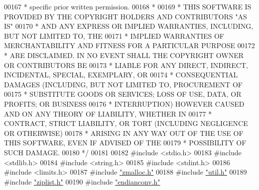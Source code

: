 \begin{DoxyCode}
00167 \textcolor{comment}{ *     specific prior written permission.}
00168 \textcolor{comment}{ *}
00169 \textcolor{comment}{ * THIS SOFTWARE IS PROVIDED BY THE COPYRIGHT HOLDERS AND CONTRIBUTORS "AS IS"}
00170 \textcolor{comment}{ * AND ANY EXPRESS OR IMPLIED WARRANTIES, INCLUDING, BUT NOT LIMITED TO, THE}
00171 \textcolor{comment}{ * IMPLIED WARRANTIES OF MERCHANTABILITY AND FITNESS FOR A PARTICULAR PURPOSE}
00172 \textcolor{comment}{ * ARE DISCLAIMED. IN NO EVENT SHALL THE COPYRIGHT OWNER OR CONTRIBUTORS BE}
00173 \textcolor{comment}{ * LIABLE FOR ANY DIRECT, INDIRECT, INCIDENTAL, SPECIAL, EXEMPLARY, OR}
00174 \textcolor{comment}{ * CONSEQUENTIAL DAMAGES (INCLUDING, BUT NOT LIMITED TO, PROCUREMENT OF}
00175 \textcolor{comment}{ * SUBSTITUTE GOODS OR SERVICES; LOSS OF USE, DATA, OR PROFITS; OR BUSINESS}
00176 \textcolor{comment}{ * INTERRUPTION) HOWEVER CAUSED AND ON ANY THEORY OF LIABILITY, WHETHER IN}
00177 \textcolor{comment}{ * CONTRACT, STRICT LIABILITY, OR TORT (INCLUDING NEGLIGENCE OR OTHERWISE)}
00178 \textcolor{comment}{ * ARISING IN ANY WAY OUT OF THE USE OF THIS SOFTWARE, EVEN IF ADVISED OF THE}
00179 \textcolor{comment}{ * POSSIBILITY OF SUCH DAMAGE.}
00180 \textcolor{comment}{ */}
00181 
00182 \textcolor{preprocessor}{#}\textcolor{preprocessor}{include} \textcolor{preprocessor}{<}\textcolor{preprocessor}{stdio}\textcolor{preprocessor}{.}\textcolor{preprocessor}{h}\textcolor{preprocessor}{>}
00183 \textcolor{preprocessor}{#}\textcolor{preprocessor}{include} \textcolor{preprocessor}{<}\textcolor{preprocessor}{stdlib}\textcolor{preprocessor}{.}\textcolor{preprocessor}{h}\textcolor{preprocessor}{>}
00184 \textcolor{preprocessor}{#}\textcolor{preprocessor}{include} \textcolor{preprocessor}{<}\textcolor{preprocessor}{string}\textcolor{preprocessor}{.}\textcolor{preprocessor}{h}\textcolor{preprocessor}{>}
00185 \textcolor{preprocessor}{#}\textcolor{preprocessor}{include} \textcolor{preprocessor}{<}\textcolor{preprocessor}{stdint}\textcolor{preprocessor}{.}\textcolor{preprocessor}{h}\textcolor{preprocessor}{>}
00186 \textcolor{preprocessor}{#}\textcolor{preprocessor}{include} \textcolor{preprocessor}{<}\textcolor{preprocessor}{limits}\textcolor{preprocessor}{.}\textcolor{preprocessor}{h}\textcolor{preprocessor}{>}
00187 \textcolor{preprocessor}{#}\textcolor{preprocessor}{include} \hyperlink{zmalloc_8h}{"zmalloc.h"}
00188 \textcolor{preprocessor}{#}\textcolor{preprocessor}{include} \hyperlink{util_8h}{"util.h"}
00189 \textcolor{preprocessor}{#}\textcolor{preprocessor}{include} \hyperlink{ziplist_8h}{"ziplist.h"}
00190 \textcolor{preprocessor}{#}\textcolor{preprocessor}{include} \hyperlink{endianconv_8h}{"endianconv.h"}

\end{DoxyCode}
